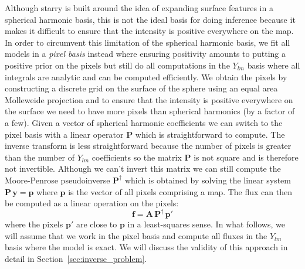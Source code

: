 \documentclass[modern]{aastex62}
\begin{document}
Although \textsf{starry} is built around the idea of expanding surface features in a spherical harmonic basis, this is not the ideal basis for doing inference because it makes it difficult to ensure that the intensity is positive everywhere on the map.
In order to circumvent this limitation of the spherical harmonic basis, we fit all models in a \emph{pixel basis} instead where ensuring positivity amounts to putting a positive prior on the pixels but still do all computations in the $Y_{lm}$ basis where all integrals are analytic and can be computed efficiently.
We obtain the pixels by constructing a discrete grid on the surface of the sphere using an equal area Molleweide projection
and to ensure that the intensity is positive everywhere on the surface we need to have more pixels than spherical harmonics (by a factor of a few).
Given a vector of spherical harmonic coefficients we can switch to the pixel basis with a linear operator $\mathbf{P}$ which is straightforward to compute.
The inverse transform is less straightforward because the number of pixels is greater than the number of $Y_{lm}$ coefficients so the matrix $\mathbf{P}$ is not square and is therefore not invertible.
Although we can't invert this matrix we can still compute the Moore-Penrose pseudoinverse $\mathbf{P}^\dagger$ which is obtained by solving the linear system $\mathbf{P}\,\mathbf{y}=\mathbf{p}$ where $\mathbf{p}$ is the vector of all pixels comprising a map. 
The flux can then be computed as a linear operation on the pixels: 
\begin{equation}
    \mathbf{f}=\mathbf{A}\,\mathbf{P}^\dagger\,\mathbf{p}'
    \label{eq:linear_model_pix}
\end{equation}
where the pixels $\mathbf{p}'$ are close to $\mathbf{p}$ in a least-squares sense.
In what follows, we will assume that we work in the pixel basis and compute all fluxes in the $Y_{lm}$ basis where the model is exact.
We will discuss the validity of this approach in detail in Section~\ref{sec:inverse_problem}.
\end{document}
